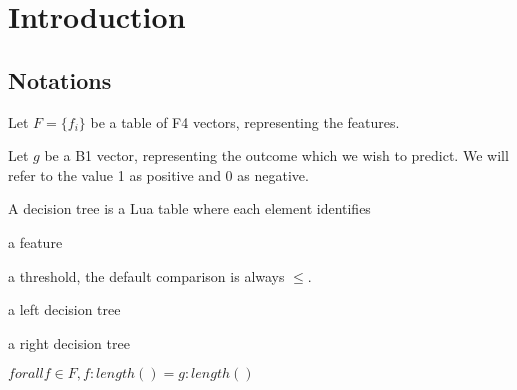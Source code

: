 
\section{Introduction}

\subsection{Notations}

\bi
\item Let \(F = \{f_i\}\) be a table of F4 vectors, representing the features.
\item Let \(g\) be a B1 vector, representing the outcome which we wish to
predict. We will refer to the value 1 as positive and 0 as negative.
\ei

A decision tree is a Lua table where each element identifies
\be
\item a feature
\item a threshold, the default comparison is always \(\leq\).
\item a left decision tree
\item a right decision tree
\ee

\begin{invariant}
\(forall f \in F, f:length() = g:length()\)
\end{invariant}

